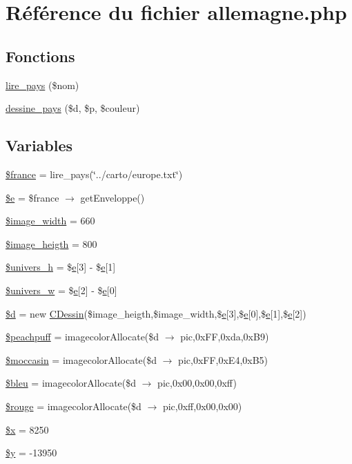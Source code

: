 \hypertarget{allemagne_8php}{
\section{R\'{e}f\'{e}rence du fichier allemagne.php}
\label{allemagne_8php}
}
\subsection*{Fonctions}
\begin{CompactItemize}
\item 
\hyperlink{allemagne_8php_a13}{lire\_\-pays} (\$nom)
\item 
\hyperlink{allemagne_8php_a14}{dessine\_\-pays} (\$d, \$p, \$couleur)
\end{CompactItemize}
\subsection*{Variables}
\begin{CompactItemize}
\item 
\hyperlink{allemagne_8php_a0}{\$france} = lire\_\-pays(\char`\"{}../carto/europe.txt\char`\"{})
\item 
\hyperlink{allemagne_8php_a1}{\$e} = \$france $\rightarrow$ get\-Enveloppe()
\item 
\hyperlink{allemagne_8php_a2}{\$image\_\-width} = 660
\item 
\hyperlink{allemagne_8php_a3}{\$image\_\-heigth} = 800
\item 
\hyperlink{allemagne_8php_a4}{\$univers\_\-h} = \$\hyperlink{apa__zone_8php_a37}{e}\mbox{[}3\mbox{]} - \$\hyperlink{apa__zone_8php_a37}{e}\mbox{[}1\mbox{]}
\item 
\hyperlink{allemagne_8php_a5}{\$univers\_\-w} = \$\hyperlink{apa__zone_8php_a37}{e}\mbox{[}2\mbox{]} - \$\hyperlink{apa__zone_8php_a37}{e}\mbox{[}0\mbox{]}
\item 
\hyperlink{allemagne_8php_a6}{\$d} = new \hyperlink{classCDessin}{CDessin}(\$image\_\-heigth,\$image\_\-width,\$\hyperlink{apa__zone_8php_a37}{e}\mbox{[}3\mbox{]},\$\hyperlink{apa__zone_8php_a37}{e}\mbox{[}0\mbox{]},\$\hyperlink{apa__zone_8php_a37}{e}\mbox{[}1\mbox{]},\$\hyperlink{apa__zone_8php_a37}{e}\mbox{[}2\mbox{]})
\item 
\hyperlink{allemagne_8php_a7}{\$peachpuff} = imagecolor\-Allocate(\$d $\rightarrow$ pic,0x\-FF,0xda,0x\-B9)
\item 
\hyperlink{allemagne_8php_a8}{\$moccasin} = imagecolor\-Allocate(\$d $\rightarrow$ pic,0x\-FF,0x\-E4,0x\-B5)
\item 
\hyperlink{allemagne_8php_a9}{\$bleu} = imagecolor\-Allocate(\$d $\rightarrow$ pic,0x00,0x00,0xff)
\item 
\hyperlink{allemagne_8php_a10}{\$rouge} = imagecolor\-Allocate(\$d $\rightarrow$ pic,0xff,0x00,0x00)
\item 
\hyperlink{allemagne_8php_a11}{\$x} = 8250
\item 
\hyperlink{allemagne_8php_a12}{\$y} = -13950
\end{CompactItemize}


